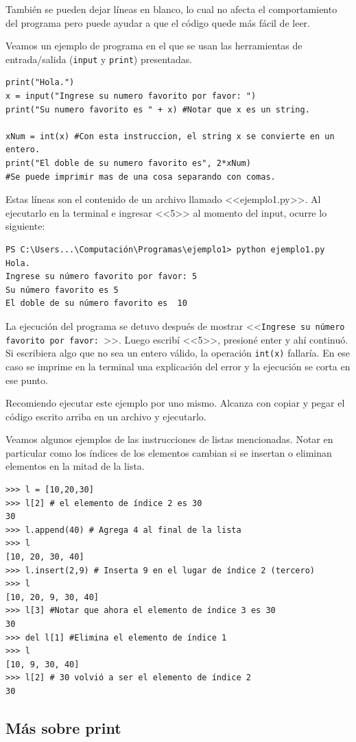 \documentclass[a4paper, 12pt]{report}
\theoremstyle{definition}
\begin{document}
También se pueden dejar líneas en blanco, lo cual no afecta el comportamiento del programa pero puede ayudar a que el código quede más fácil de leer.

Veamos un ejemplo de programa en el que se usan las herramientas de entrada/salida ({\tt input} y {\tt print}) presentadas.
\begin{verbatim}
print("Hola.")
x = input("Ingrese su numero favorito por favor: ")
print("Su numero favorito es " + x) #Notar que x es un string.

xNum = int(x) #Con esta instruccion, el string x se convierte en un entero.
print("El doble de su numero favorito es", 2*xNum)
#Se puede imprimir mas de una cosa separando con comas.
\end{verbatim}
Estas líneas son el contenido de un archivo llamado <<ejemplo1.py>>. Al ejecutarlo en la terminal e ingresar <<5>> al momento del input, ocurre lo siguiente:
\begin{verbatim}
PS C:\Users...\Computación\Programas\ejemplo1> python ejemplo1.py
Hola.
Ingrese su número favorito por favor: 5
Su número favorito es 5
El doble de su número favorito es  10
\end{verbatim}
La ejecución del programa se detuvo después de mostrar <<{\tt Ingrese su número favorito por favor: }>>. Luego escribí <<5>>, presioné enter y ahí continuó. Si escribiera algo que no sea un entero válido, la operación {\tt int(x)} fallaría. En ese caso se imprime en la terminal una explicación del error y la ejecución se corta en ese punto.

Recomiendo ejecutar este ejemplo por uno mismo. Alcanza con copiar y pegar el código escrito arriba en un archivo y ejecutarlo.

Veamos algunos ejemplos de las instrucciones de listas mencionadas. Notar en particular como los índices de los elementos cambian si se insertan o eliminan elementos en la mitad de la lista.
\begin{verbatim}
>>> l = [10,20,30]
>>> l[2] # el elemento de índice 2 es 30
30
>>> l.append(40) # Agrega 4 al final de la lista
>>> l
[10, 20, 30, 40]
>>> l.insert(2,9) # Inserta 9 en el lugar de índice 2 (tercero)
>>> l
[10, 20, 9, 30, 40]
>>> l[3] #Notar que ahora el elemento de índice 3 es 30
30
>>> del l[1] #Elimina el elemento de índice 1
>>> l
[10, 9, 30, 40]
>>> l[2] # 30 volvió a ser el elemento de índice 2 
30
\end{verbatim}

\subsection{Más sobre print}
\end{document}
